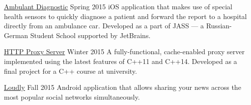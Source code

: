 
\begin{cvprojects}

  \cvproject
    {\underline{\href{https://research.jetbrains.org/groups/robolab/schools?id=9}{Ambulant Diagnostic}}}
    {Spring 2015}
    { iOS application that makes use of special health sensors to quickly diagnose a patient and forward the report to a hospital directly from an ambulance car. Developed as a part of JASS --- a Russian-German Student School supported by JetBrains.
     }
    
  \cvproject
    {\underline{\href{https://github.com/ZeRoGerc/cpp_proxy}{HTTP Proxy Server}}}
    {Winter 2015}
    {A fully-functional, cache-enabled proxy server implemented using the latest features of C++11 and C++14. Developed as a final project for a C++ course at university.}

  \cvproject
    {\underline{\href{https://github.com/ZeRoGerc/loudly}{Loudly}}}
    {Fall 2015}
    {Android application that allows sharing your news across the most popular social networks simultaneously.}
    
\end{cvprojects}